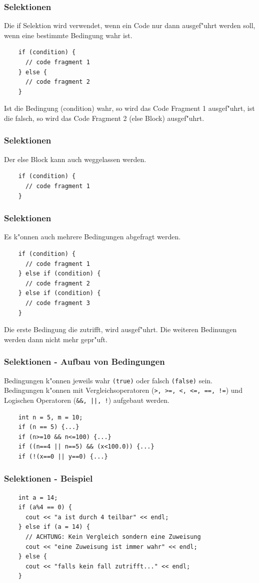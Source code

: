 \documentclass{beamer}
\begin{document}
\begin{frame}[fragile]
	\frametitle{Selektionen}
	Die if Selektion wird verwendet, wenn ein Code nur dann ausgef"uhrt
	werden soll, wenn eine bestimmte Bedingung wahr ist.
	\begin{lstlisting}
	if (condition) {
  	  // code fragment 1
	} else {
  	  // code fragment 2
	}
	\end{lstlisting}
	Ist die Bedingung (condition) wahr, so wird das Code Fragment 1 ausgef"uhrt, ist die
	falsch, so wird das Code Fragment 2 (else Block) ausgef"uhrt.\\
\end{frame}

\begin{frame}[fragile]
	\frametitle{Selektionen}
	Der else Block kann auch weggelassen werden.
	\begin{lstlisting}
	if (condition) {
  	  // code fragment 1
	}
	\end{lstlisting}
\end{frame}

\begin{frame}[fragile]
	\frametitle{Selektionen}
	Es k"onnen auch mehrere Bedingungen abgefragt werden.
	\begin{lstlisting}
	if (condition) {
  	  // code fragment 1
	} else if (condition) {
	  // code fragment 2
	} else if (condition) {
	  // code fragment 3
	}
	\end{lstlisting}
	Die erste Bedingung die zutrifft, wird ausgef"uhrt. Die weiteren
	Bedinungen werden dann nicht mehr gepr"uft.
\end{frame}

\begin{frame}[fragile]
	\frametitle{Selektionen - Aufbau von Bedingungen}
	Bedingungen k"onnen jeweils wahr \verb|(true)| oder falsch \verb|(false)| sein.\\
	Bedingungen k"onnen mit Vergleichsoperatoren (\verb|>, >=, <, <=, ==, !=|) und Logischen Operatoren
	(\verb=&&, ||, !=) aufgebaut werden.
	\begin{lstlisting}
	int n = 5, m = 10;
	if (n == 5) {...}
	if (n>=10 && n<=100) {...}
	if ((n==4 || n==5) && (x<100.0)) {...}
	if (!(x==0 || y==0) {...}
	\end{lstlisting}
\end{frame}

\begin{frame}[fragile]
	\frametitle{Selektionen - Beispiel}
	\begin{lstlisting}
	int a = 14;
	if (a%4 == 0) {
	  cout << "a ist durch 4 teilbar" << endl;
	} else if (a = 14) { 
	  // ACHTUNG: Kein Vergleich sondern eine Zuweisung
	  cout << "eine Zuweisung ist immer wahr" << endl;
	} else {
	  cout << "falls kein fall zutrifft..." << endl;
	}
	\end{lstlisting}
\end{frame}
\end{document}
